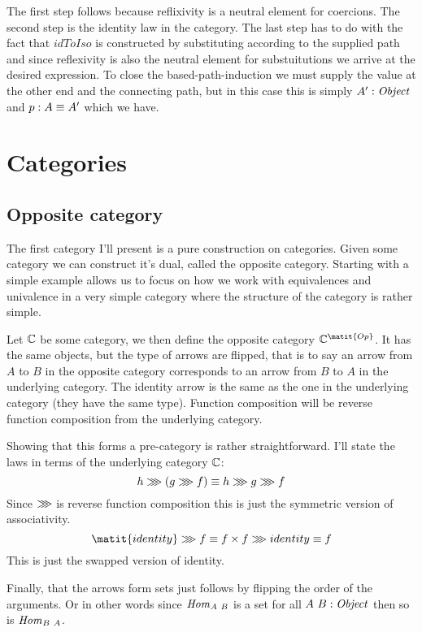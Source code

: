 %
The first step follows because reflixivity is a neutral element for coercions.
The second step is the identity law in the category. The last step has to do
with the fact that $\mathit{idToIso}$ is constructed by substituting according
to the supplied path and since reflexivity is also the neutral element for
substuitutions we arrive at the desired expression. To close the
based-path-induction we must supply the value at the other end and the
connecting path, but in this case this is simply $A' \;\mathord{:}\; \mathit{Object}$ and $p \;\mathord{:}\; A
\equiv A'$ which we have.
%
\section{Categories}
\subsection{Opposite category}
\label{op-cat}
The first category I'll present is a pure construction on categories. Given some
category we can construct it's dual, called the opposite category. Starting with
a simple example allows us to focus on how we work with equivalences and
univalence in a very simple category where the structure of the category is
rather simple.

Let $\mathbb{C}$ be some category, we then define the opposite category
$\bC^{\matit{Op}}$. It has the same objects, but the type of arrows are flipped,
that is to say an arrow from $A$ to $B$ in the opposite category corresponds to
an arrow from $B$ to $A$ in the underlying category. The identity arrow is the
same as the one in the underlying category (they have the same type). Function
composition will be reverse function composition from the underlying category.

Showing that this forms a pre-category is rather straightforward. I'll state the
laws in terms of the underlying category $\mathbb{C}$:
%
$$
h \ggg (g \ggg f) \equiv h \ggg g \ggg f
$$
%
Since $\ggg$ is reverse function composition this is just the symmetric version
of associativity.
%
$$
\matit{identity} \rrr f \equiv f \x f \rrr identity \equiv f
$$
%
This is just the swapped version of identity.

Finally, that the arrows form sets just follows by flipping the order of the
arguments. Or in other words since $\mathit{Hom}_{A\ B}$ is a set for all $A\ B \;\mathord{:}\;
\mathit{Object}$ then so is $\Hom_{B\ A}$.


